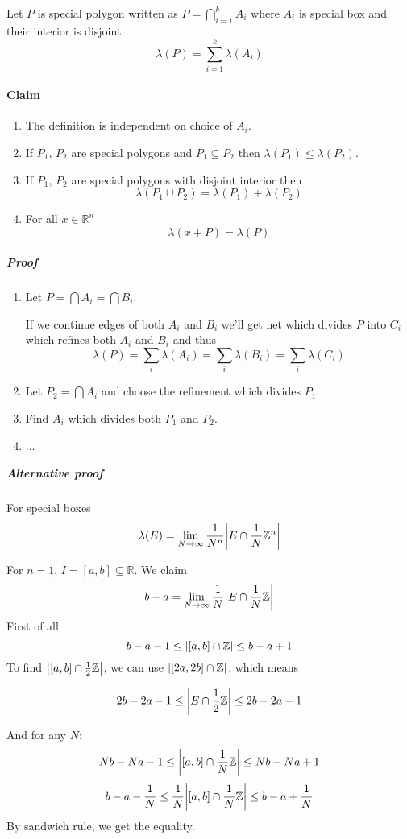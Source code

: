  Let $P$ is special polygon written as $P = \bigcap_{i=1}^k A_i$ where $A_i$ is special box and their interior is disjoint.
 $$\lambda(P) = \sum_{i=1}^k \lambda(A_i)$$
 \paragraph{Claim}
 \begin{enumerate}
 	\item The definition is independent on choice of $A_i$.
 	\item If $P_1$, $P_2$ are special polygons and $P_1\subseteq P_2$ then $\lambda(P_1)\leq \lambda(P_2)$.
 	\item If $P_1$, $P_2$ are  special polygons with disjoint interior then
 	$$\lambda(P_1\cup P_2) =  \lambda(P_1)+\lambda(P_2)$$
 	\item For all $x\in \mathbb{R}^n$ 
 	$$\lambda(x+P) = \lambda(P)$$
 \end{enumerate}
 \subparagraph{Proof}
  \begin{enumerate}
 	\item Let $P = \bigcap A_i = \bigcap B_i$.
 	
 	If we continue edges of both $A_i$ and $B_i$ we'll get net which divides $P$ into $C_i$ which refines both $A_i$ and $B_i$ and thus
 	$$\lambda(P) = \sum_i \lambda(A_i) = \sum_i \lambda(B_i) = \sum_i \lambda(C_i)$$ 
 	\item Let $P_2= \bigcap A_i$ and choose the refinement which divides $P_1$. 
 	\item Find $A_i$ which divides both $P_1$ and $P_2$.
 	\item $\dots$
 \end{enumerate}
\subparagraph{Alternative proof}
For special boxes
$$\lambda(E) = \lim_{N\to \infty} \frac{1}{N^n} \abs{E \cap \frac{1}{N}\mathbb{Z}^n}$$

For $n=1$, $I=[a,b] \subseteq \mathbb{R}$. We claim
$$b-a = \lim_{N\to \infty} \frac{1}{N} \abs{E \cap \frac{1}{N}\mathbb{Z}}$$
First of all
$$b-a-1 \leq \abs{[a,b] \cap \mathbb{Z}} \leq b-a+1$$
To find $\abs{[a,b] \cap \frac{1}{2}\mathbb{Z}}$, we can use $\abs{[2a,2b] \cap \mathbb{Z}}$, which means

$$2b-2a-1 \leq \abs{E \cap \frac{1}{2}\mathbb{Z}} \leq 2b-2a+1$$

And for any $N$:
$$Nb-Na-1 \leq \abs{[a,b] \cap \frac{1}{N}\mathbb{Z}} \leq Nb-Na+1$$
$$b-a-\frac{1}{N} \leq \frac{1}{N}\abs{[a,b] \cap \frac{1}{N}\mathbb{Z}} \leq b-a+\frac{1}{N}$$
By sandwich rule, we get the equality.

